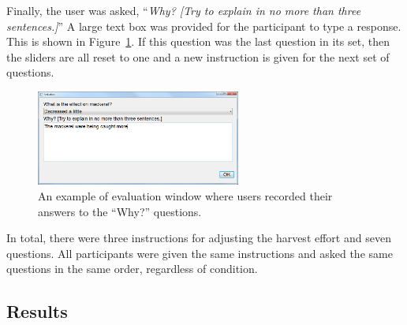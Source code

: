 Finally, the user was asked, ``\textit{Why? [Try to explain in no more than three sentences.]}''  A large text box was provided for the participant to type a response.  This is shown in Figure~\ref{fig:eval_why}. If this question was the last question in its set, then the sliders are all reset to one and a new instruction is given for the next set of questions. 

\begin{figure}[h]
	\centering
	\includegraphics[width=0.6\textwidth]{figures/png/eval_why.png}
	\caption{An example of evaluation window where users recorded their answers to the ``Why?'' questions.}
	\label{fig:eval_why}
\end{figure}

In total, there were three instructions for adjusting the harvest effort and seven questions.  All participants were given the same instructions and asked the same questions in the same order, regardless of condition.

\subsection{Results}

